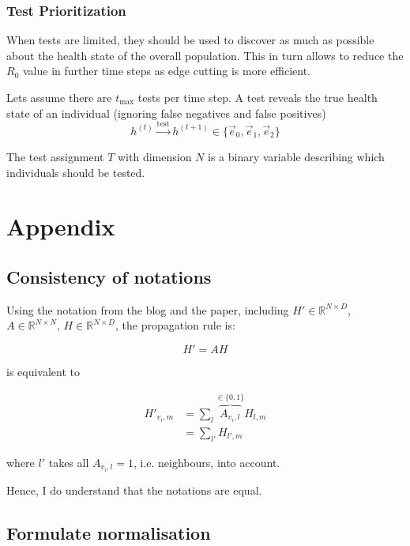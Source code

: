 \documentclass[]{article}
\begin{document}
\subsubsection{Test Prioritization}
When tests are limited, they should be used to discover as much as possible about the health state of the overall population.
This in turn allows to reduce the $R_0$ value in further time steps as edge cutting is more efficient.

Lets assume there are $t_{\text{max}}$ tests per time step.
A test reveals the true health state of an individual (ignoring false negatives and false positives)
\begin{equation}
	h^{(t)} \xrightarrow{\text{test}} h^{(t+1)} \in \{\vec{e}_0, \vec{e}_1, \vec{e}_2 \}
\end{equation}

The test assignment $T$ with dimension $N$ is a binary variable describing which individuals should be tested.

\section{Appendix}

\subsection{Consistency of notations}
\label{sec:consistency}

Using the notation from the blog and the paper, including $H'\in\mathbb{R}^{N\times D}$, $A\in\mathbb{R}^{N\times N}$, $H\in\mathbb{R}^{N\times D}$, the propagation rule is:

\begin{equation}
	H' = A H
\end{equation}

is equivalent to

\begin{equation}
	\begin{split}
		H'_{v_i, m} & = \sum_l \overbrace{A_{v_i, l}}^{\in \{0, 1\}} H_{l, m} \\
		            & = \sum_{l'} H_{l',m}
	\end{split}
\end{equation}

where $l'$ takes all $A_{v_i,l}=1$, i.e. neighbours, into account.

Hence, I do understand that the notations are equal.

\subsection{Formulate normalisation}
\end{document}
